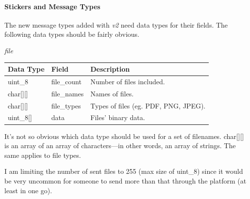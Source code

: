 \documentclass{article}
\begin{document}
\newpage

\paragraph{Stickers and Message Types}
The new message types added with \textit{v2} need data types for their fields. The following data types should be fairly obvious.

\begin{center}
    \Large{\textit{file}}
\end{center}
\begin{table}[H]
\centering
\begin{tabular}{|p{1.3cm}|p{2.5cm}|p{5.5cm}|}
\hline
\rowcolor{tblgrey} 
Data Type       & Field           & Description                                              \\ \hline
uint\_8         & file\_count     & Number of files included.                                 \\ \hline
char[\hspace{0.05cm}][\hspace{0.05cm}] & file\_names     & Names of files.                                           \\ \hline
char[\hspace{0.05cm}][\hspace{0.05cm}] & file\_types     & Types of files (eg. PDF, PNG, JPEG).                      \\ \hline
uint\_8[\hspace{0.05cm}]         & data            & Files' binary data.                                       \\ \hline
\end{tabular}
\end{table}
It's not so obvious which data type should be used for a set of filenames. char[\hspace{0.05cm}][\hspace{0.05cm}] is an array of an array of characters---in other words, an array of strings. The same applies to file types.

I am limiting the number of sent files to 255 (max size of uint\_8) since it would be very uncommon for someone to send more than that through the platform (at least in one go).
\end{document}
